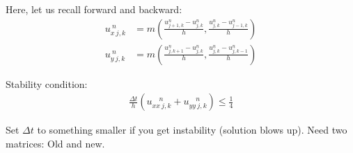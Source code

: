 Here, let us recall forward and backward:
%
\begin{align}
  u^{\ n}_{x\ j, k} & = m(\frac{u^n_{j+1, k} - u^n_{j, k}}{h}, \frac{u^n_{j, k} - u^n_{j-1, k}}{h})\\
  u^{\ n}_{y\ j, k} & = m(\frac{u^n_{j, k+1} - u^n_{j, k}}{h}, \frac{u^n_{j, k} - u^n_{j, k - 1}}{h})
\end{align}

Stability condition:
%
\begin{align}
  \frac{\Delta t}{h} (u^{\quad n}_{xx\ j, k} + u^{\quad n}_{yy\ j, k}) \leq \frac{1}{4}
\end{align}

Set $\Delta t$ to something smaller if you get instability (solution blows up). Need two matrices: Old and new.
